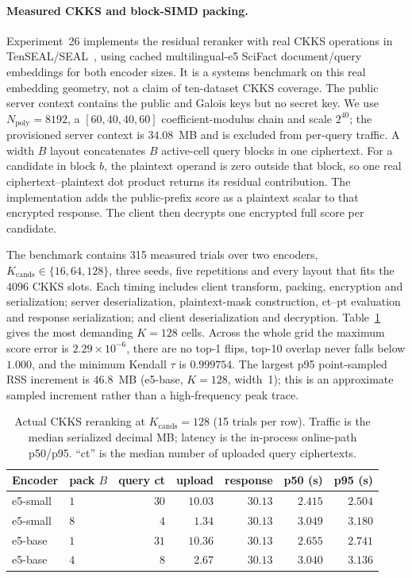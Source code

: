 \documentclass[11pt,a4paper]{article}
\begin{document}
\paragraph{Measured CKKS and block-SIMD packing.}\label{ssec:shard-ckks}
Experiment~26 implements the residual reranker with real CKKS operations in
TenSEAL/SEAL~\cite{ref_tenseal}, using cached multilingual-e5 SciFact
document/query embeddings for both encoder sizes. It is a systems benchmark
on this real embedding geometry, not a claim of ten-dataset CKKS coverage.
The public server context contains the public and Galois keys but no secret
key. We use $N_{\mathrm{poly}}=8192$, a
$[60,40,40,60]$ coefficient-modulus chain and scale $2^{40}$; the provisioned
server context is $34.08$~MB and is excluded from per-query traffic. A width
$B$ layout concatenates $B$ active-cell query blocks in one ciphertext. For a
candidate in block $b$, the plaintext operand is zero outside that block, so
one real ciphertext--plaintext dot product returns its residual contribution.
The implementation adds the public-prefix score as a plaintext scalar to that
encrypted response. The client then decrypts one encrypted full score per
candidate.

The benchmark contains 315 measured trials over two encoders,
$K_{\mathrm{cands}}\in\{16,64,128\}$, three seeds, five repetitions and every
layout that fits the $4096$ CKKS slots. Each timing includes client transform,
packing, encryption and serialization; server deserialization, plaintext-mask
construction, ct--pt evaluation and response serialization; and client
deserialization and decryption. Table~\ref{tab:shard-ckks} gives the most
demanding $K=128$ cells. Across the whole grid the maximum score error is
$2.29\times10^{-6}$, there are no top-1 flips, top-10 overlap never falls below
$1.000$, and the minimum Kendall $\tau$ is $0.999754$. The largest p95
point-sampled RSS increment is $46.8$~MB (e5-base, $K=128$, width~1); this is
an approximate sampled increment rather than a high-frequency peak trace.

\begin{table}[tbp]
\centering
\caption{Actual CKKS reranking at $K_{\mathrm{cands}}=128$ (15 trials per
row). Traffic is the median serialized decimal MB; latency is the in-process
online-path p50/p95. ``ct'' is the median number of uploaded query
ciphertexts.}
\label{tab:shard-ckks}
\small
\begin{tabular}{@{}llrrrrr@{}}
\toprule
Encoder & pack $B$ & query ct & upload & response & p50 (s) & p95 (s) \\ \midrule
e5-small & $1$ & $30$ & $10.03$ & $30.13$ & $2.415$ & $2.504$ \\
e5-small & $8$ & $4$  & $1.34$  & $30.13$ & $3.049$ & $3.180$ \\
e5-base  & $1$ & $31$ & $10.36$ & $30.13$ & $2.655$ & $2.741$ \\
e5-base  & $4$ & $8$  & $2.67$  & $30.13$ & $3.040$ & $3.136$ \\
\bottomrule
\end{tabular}
\end{table}
\end{document}
